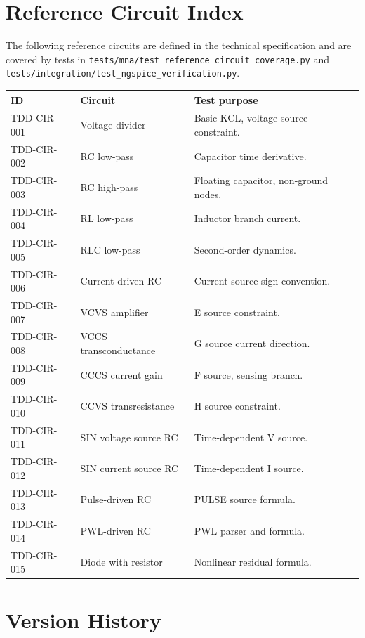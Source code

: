 \documentclass[11pt,a4paper]{article}
\newcommand{\code}[1]{\texttt{#1}}
\begin{document}
\section{Reference Circuit Index}
\label{app:reference-circuits}

The following reference circuits are defined in the technical specification
and are covered by tests in \code{tests/mna/test\_reference\_circuit\_coverage.py}
and \code{tests/integration/test\_ngspice\_verification.py}.

\begin{longtable}{p{}p{}p{}}
\toprule
ID & Circuit & Test purpose \\
\midrule
TDD-CIR-001 & Voltage divider          & Basic KCL, voltage source constraint. \\
TDD-CIR-002 & RC low-pass              & Capacitor time derivative. \\
TDD-CIR-003 & RC high-pass             & Floating capacitor, non-ground nodes. \\
TDD-CIR-004 & RL low-pass              & Inductor branch current. \\
TDD-CIR-005 & RLC low-pass             & Second-order dynamics. \\
TDD-CIR-006 & Current-driven RC        & Current source sign convention. \\
TDD-CIR-007 & VCVS amplifier           & E source constraint. \\
TDD-CIR-008 & VCCS transconductance    & G source current direction. \\
TDD-CIR-009 & CCCS current gain        & F source, sensing branch. \\
TDD-CIR-010 & CCVS transresistance     & H source constraint. \\
TDD-CIR-011 & SIN voltage source RC    & Time-dependent V source. \\
TDD-CIR-012 & SIN current source RC    & Time-dependent I source. \\
TDD-CIR-013 & Pulse-driven RC          & PULSE source formula. \\
TDD-CIR-014 & PWL-driven RC            & PWL parser and formula. \\
TDD-CIR-015 & Diode with resistor      & Nonlinear residual formula. \\
\bottomrule
\end{longtable}

\section{Version History}
\label{app:changelog}
\end{document}
